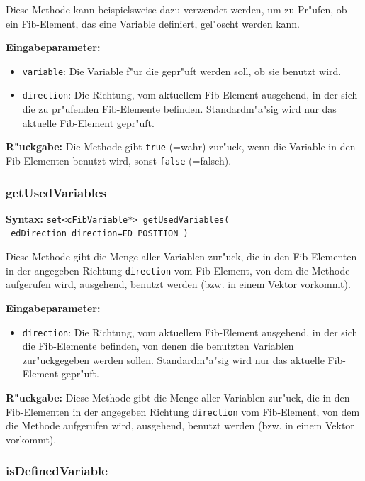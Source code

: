 Diese Methode kann beispielsweise dazu verwendet werden, um zu Pr"ufen, ob ein Fib-Element, das eine Variable definiert, gel"oscht werden kann.

\bigskip\noindent
\textbf{Eingabeparameter:} 
\begin{itemize}
 \item \verb|variable|: Die Variable f"ur die gepr"uft werden soll, ob sie benutzt wird.
 \item \verb|direction|: Die Richtung, vom aktuellem Fib-Element ausgehend, in der sich die zu pr"ufenden Fib-Elemente befinden. Standardm"a"sig wird nur das aktuelle Fib-Element gepr"uft.
\end{itemize}

\bigskip\noindent
\textbf{R"uckgabe:} Die Methode gibt \verb|true| (=wahr) zur"uck, wenn die Variable in den Fib-Elementen benutzt wird, sonst \verb|false| (=falsch).


\subsubsection{getUsedVariables}

\textbf{Syntax:} \verb|set<cFibVariable*> getUsedVariables(| \\\verb| edDirection direction=ED_POSITION )|

\bigskip\noindent
Diese Methode gibt die Menge aller Variablen zur"uck, die in den Fib-Elementen in der angegeben Richtung \verb|direction| vom Fib-Element, von dem die Methode aufgerufen wird, ausgehend, benutzt werden (bzw. in einem Vektor vorkommt).

\bigskip\noindent
\textbf{Eingabeparameter:} 
\begin{itemize}
 \item \verb|direction|: Die Richtung, vom aktuellem Fib-Element ausgehend, in der sich die Fib-Elemente befinden, von denen die benutzten Variablen zur"uckgegeben werden sollen. Standardm"a"sig wird nur das aktuelle Fib-Element gepr"uft.
\end{itemize}

\bigskip\noindent
\textbf{R"uckgabe:} Diese Methode gibt die Menge aller Variablen zur"uck, die in den Fib-Elementen in der angegeben Richtung \verb|direction| vom Fib-Element, von dem die Methode aufgerufen wird, ausgehend, benutzt werden (bzw. in einem Vektor vorkommt).


\subsubsection{isDefinedVariable}

